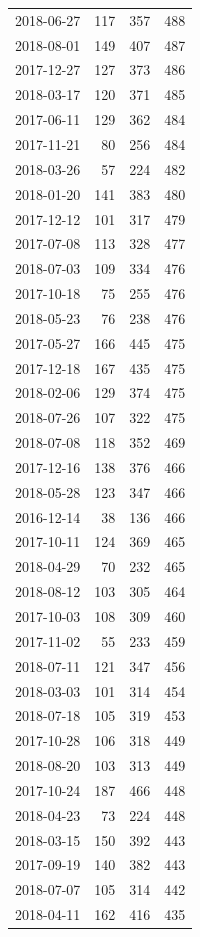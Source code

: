 \begin{tabular}{lrrr}
2018-06-27 & 117 & 357 & 488 \\
2018-08-01 & 149 & 407 & 487 \\
2017-12-27 & 127 & 373 & 486 \\
2018-03-17 & 120 & 371 & 485 \\
2017-06-11 & 129 & 362 & 484 \\
2017-11-21 & 80 & 256 & 484 \\
2018-03-26 & 57 & 224 & 482 \\
2018-01-20 & 141 & 383 & 480 \\
2017-12-12 & 101 & 317 & 479 \\
2017-07-08 & 113 & 328 & 477 \\
2018-07-03 & 109 & 334 & 476 \\
2017-10-18 & 75 & 255 & 476 \\
2018-05-23 & 76 & 238 & 476 \\
2017-05-27 & 166 & 445 & 475 \\
2017-12-18 & 167 & 435 & 475 \\
2018-02-06 & 129 & 374 & 475 \\
2018-07-26 & 107 & 322 & 475 \\
2018-07-08 & 118 & 352 & 469 \\
2017-12-16 & 138 & 376 & 466 \\
2018-05-28 & 123 & 347 & 466 \\
2016-12-14 & 38 & 136 & 466 \\
2017-10-11 & 124 & 369 & 465 \\
2018-04-29 & 70 & 232 & 465 \\
2018-08-12 & 103 & 305 & 464 \\
2017-10-03 & 108 & 309 & 460 \\
2017-11-02 & 55 & 233 & 459 \\
2018-07-11 & 121 & 347 & 456 \\
2018-03-03 & 101 & 314 & 454 \\
2018-07-18 & 105 & 319 & 453 \\
2017-10-28 & 106 & 318 & 449 \\
2018-08-20 & 103 & 313 & 449 \\
2017-10-24 & 187 & 466 & 448 \\
2018-04-23 & 73 & 224 & 448 \\
2018-03-15 & 150 & 392 & 443 \\
2017-09-19 & 140 & 382 & 443 \\
2018-07-07 & 105 & 314 & 442 \\
2018-04-11 & 162 & 416 & 435 \\

\end{tabular}

